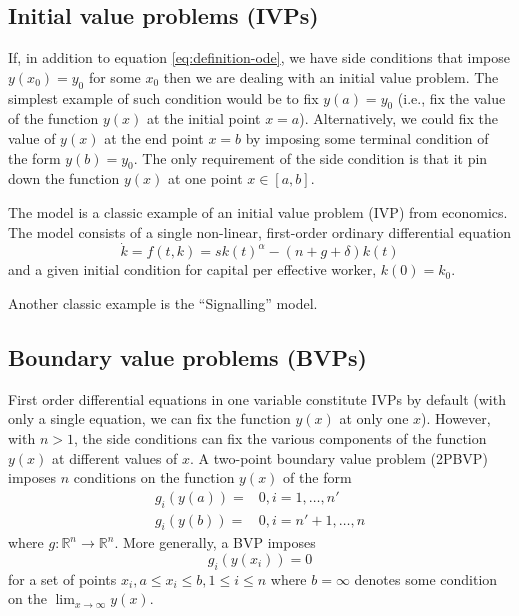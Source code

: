 \documentclass[11pt]{article}
\begin{document}
\subsection{Initial value problems (IVPs)}
If, in addition to equation \ref{eq:definition-ode}, we have side conditions that impose $y(x_0) = y_0$ for some $x_0$ then we are dealing with an initial value problem.  The simplest example of such condition would be to fix $y(a) = y_0$ (i.e., fix the value of the function $y(x)$ at the initial point $x=a$). Alternatively, we could fix the value of $y(x)$ at the end point $x=b$ by imposing some terminal condition of the form $y(b)=y_0$.  The only requirement of the side condition is that it pin down the function $y(x)$ at one point $x\in[a,b]$.

The \cite{solow1956contribution} model is a classic example of an initial value problem (IVP) from economics.  The \cite{solow1956contribution} model consists of a single non-linear, first-order ordinary differential equation
\begin{equation}\label{eq:solow-model}
	\dot{k} = f(t, k) = sk(t)^{\alpha} - (n+g+\delta) k(t)
\end{equation}
and a given initial condition for capital per effective worker, $k(0) = k_0$.  
 
Another classic example is the \cite{spence1973job} ``Signalling'' model. 

\subsection{Boundary value problems (BVPs)}
First order differential equations in one variable constitute IVPs by default (with only a single equation, we can fix the function $y(x)$ at only one $x$). However, with $n>1$, the side conditions can fix the various components of the function $y(x)$ at different values of $x$.  A two-point boundary value problem (2PBVP) imposes $n$ conditions on the function $y(x)$ of the form
\begin{align}
	g_i(y(a)) =& 0, i=1,\dots,n' \\
	g_i(y(b)) =& 0, i=n' + 1,\dots,n 
\end{align}
where $g:\mathbb{R}^n\rightarrow\mathbb{R}^n$. More generally, a BVP imposes 
\begin{equation}
	g_i(y(x_i)) = 0
\end{equation}
for a set of points $x_i, a \le x_i \le b, 1 \le i \le n$ where $b=\infty$ denotes some condition on the $\lim_{x\rightarrow\infty} y(x)$. 
\end{document}
